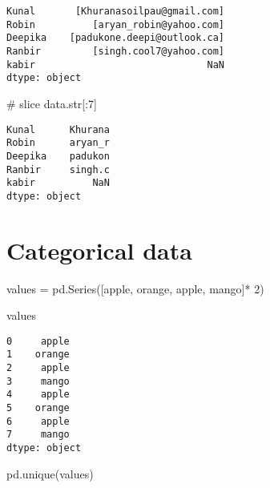 \documentclass[
  letterpaper,
  DIV=11,
  numbers=noendperiod]{scrreprt}
\newenvironment{Shaded}{\begin{snugshade}}{\end{snugshade}}
\newcommand{\BuiltInTok}[1]{\textcolor[rgb]{0.00,0.23,0.31}{#1}}
\newcommand{\CommentTok}[1]{\textcolor[rgb]{0.37,0.37,0.37}{#1}}
\newcommand{\DecValTok}[1]{\textcolor[rgb]{0.68,0.00,0.00}{#1}}
\newcommand{\NormalTok}[1]{\textcolor[rgb]{0.00,0.23,0.31}{#1}}
\newcommand{\OperatorTok}[1]{\textcolor[rgb]{0.37,0.37,0.37}{#1}}
\newcommand{\StringTok}[1]{\textcolor[rgb]{0.13,0.47,0.30}{#1}}
\begin{document}
\begin{verbatim}
Kunal       [Khuranasoilpau@gmail.com]
Robin          [aryan_robin@yahoo.com]
Deepika    [padukone.deepi@outlook.ca]
Ranbir         [singh.cool7@yahoo.com]
kabir                              NaN
dtype: object
\end{verbatim}

\begin{Shaded}
\begin{Highlighting}[]
\CommentTok{\# slice}
\NormalTok{data.}\BuiltInTok{str}\NormalTok{[:}\DecValTok{7}\NormalTok{]}
\end{Highlighting}
\end{Shaded}

\begin{verbatim}
Kunal      Khurana
Robin      aryan_r
Deepika    padukon
Ranbir     singh.c
kabir          NaN
dtype: object
\end{verbatim}

\hypertarget{categorical-data-1}{%
\section{Categorical data}\label{categorical-data-1}}

\begin{Shaded}
\begin{Highlighting}[]
\NormalTok{values }\OperatorTok{=}\NormalTok{ pd.Series([}\StringTok{\textquotesingle{}apple\textquotesingle{}}\NormalTok{, }\StringTok{\textquotesingle{}orange\textquotesingle{}}\NormalTok{, }\StringTok{\textquotesingle{}apple\textquotesingle{}}\NormalTok{, }\StringTok{\textquotesingle{}mango\textquotesingle{}}\NormalTok{]}\OperatorTok{*} \DecValTok{2}\NormalTok{)}
\end{Highlighting}
\end{Shaded}

\begin{Shaded}
\begin{Highlighting}[]
\NormalTok{values}
\end{Highlighting}
\end{Shaded}

\begin{verbatim}
0     apple
1    orange
2     apple
3     mango
4     apple
5    orange
6     apple
7     mango
dtype: object
\end{verbatim}

\begin{Shaded}
\begin{Highlighting}[]
\NormalTok{pd.unique(values)}
\end{Highlighting}
\end{Shaded}
\end{document}

